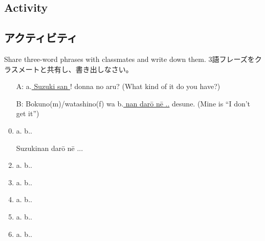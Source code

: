\documentclass[uplatex,dvipdfmx,b5paper,english,10pt]{jsbook}
\begin{document}
\ifEnglish
\subsection{Activity}
\else
\subsection{アクティビティ}
\fi

\begin{toiquestion}
\ifEnglish
Share three-word phrases with classmates and write down them.
\else
3語フレーズをクラスメートと共有し、書き出しなさい。
\fi
\end{toiquestion}

\begin{itemize}
 \item[A:] a.\underline{ Suzuki san }! donna no aru? (What kind of it do you have?)
 \item[B:] Bokuno(m)/watashino(f) wa b.\underline{ nan dar\=o n\=e ..} desune. (Mine is ``I don't get it'')
\end{itemize}

\begin{enumerate}
 \setcounter{enumi}{-1}
 \item a.\underline{\hspace{9zw}} b.\underline{\hspace{24zw}}.
 \vspace{-1.1\baselineskip}
 \item[] \hspace{3zw}Suzuki\hspace{6zw}nan dar\=o n\=e ...
 \item a.\underline{\hspace{9zw}} b.\underline{\hspace{24zw}}.
 \item a.\underline{\hspace{9zw}} b.\underline{\hspace{24zw}}.
 \item a.\underline{\hspace{9zw}} b.\underline{\hspace{24zw}}.
 \item a.\underline{\hspace{9zw}} b.\underline{\hspace{24zw}}.
 \item a.\underline{\hspace{9zw}} b.\underline{\hspace{24zw}}.
\end{enumerate}
\end{document}

